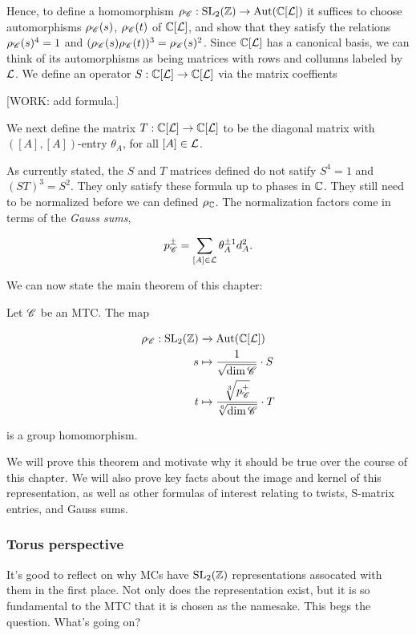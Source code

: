 Hence, to define a homomorphism $\rho_{\mathscr{C}}:\operatorname{SL}_2(\mathbb{Z})\to \operatorname{Aut}(\mathbb{C}[\mathcal{L}])$ it suffices to choose automorphisms $\rho_{\mathscr{C}}(s)$, $\rho_{\mathscr{C}}(t)$ of $\mathbb{C}[\mathcal{L}]$, and show that they satisfy the relations $\rho_{\mathscr{C}}(s)^4=1$ and $(\rho_{\mathscr{C}}(s)\rho_{\mathscr{C}}(t))^3=\rho_{\mathscr{C}}(s)^2$. Since $\mathbb{C}[\mathcal{L}]$ has a canonical basis, we can think of its automorphisms as being matrices with rows and collumns labeled by $\mathcal{L}$. We define an operator $S:\mathbb{C}[\mathcal{L}]\to \mathbb{C}[\mathcal{L}]$ via the matrix coeffients

[WORK: add formula.]

We next define the matrix $T:\mathbb{C}[\mathcal{L}]\to\mathbb{C}[\mathcal{L}]$ to be the diagonal matrix with $([A],[A])$-entry $\theta_{A}$, for all $[A]\in \mathcal{L}$.

As currently stated, the $S$ and $T$ matrices defined do not satify $S^4=1$ and $(ST)^3=S^2$. They only satisfy these formula up to phases in $\mathbb{C}$. They still need to be normalized before we can defined $\rho_{\mathbb{C}}$. The normalization factors come in terms of the \textit{Gauss sums},

$$p^{\pm}_{\mathscr{C}}=\sum_{[A]\in \mathcal{L}}\theta_A^{\pm 1}d_A^2.$$

We can now state the main theorem of this chapter:

\begin{theorem}[?] Let $\mathscr{C}$ be an MTC. The map

\begin{align*}
\rho_{\mathscr{C}}:\operatorname{SL}_2(\mathbb{Z})&\xrightarrow{}\operatorname{Aut}(\mathbb{C}[\mathcal{L}])\\
s & \mapsto \frac{1}{\sqrt{\dim \mathscr{C}}}\cdot S\\ 
t & \mapsto \frac{\sqrt[3]{p_{\mathscr{C}}^{+}}}{\sqrt[6]{\dim \mathscr{C}}}\cdot T
\end{align*}

is a group homomorphism.
\end{theorem}

We will prove this theorem and motivate why it should be true over the course of this chapter. We will also prove key facts about the image and kernel of this representation, as well as other formulas of interest relating to twists, S-matrix entries, and Gauss sums.

\subsubsection{Torus perspective}

It's good to reflect on why MCs have $\operatorname{SL}_2(\mathbb{Z})$ representations assocated with them in the first place. Not only does the representation exist, but it is so fundamental to the MTC that it is chosen as the namesake. This begs the question. What's going on?

